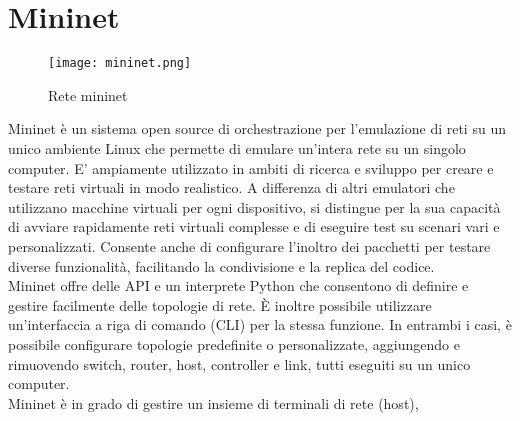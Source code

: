 \section{Mininet}
\label{ch:Mininet}
\begin{figure}[h]
    \centering
   \texttt{[image: mininet.png]}
    \caption{Rete mininet}
    \label{fig:mininet}
\end{figure}
Mininet \cite{mininet} è un sistema open source di orchestrazione per l'emulazione di reti su un unico ambiente Linux che permette di emulare un'intera rete su un singolo computer.
E' ampiamente utilizzato in ambiti di ricerca e sviluppo per creare e testare reti virtuali in modo realistico.
A differenza di altri emulatori che utilizzano macchine virtuali per ogni dispositivo, si distingue per la sua capacità di avviare rapidamente reti virtuali complesse e di eseguire test su scenari vari e personalizzati.
Consente anche di configurare l'inoltro dei pacchetti per testare diverse funzionalità, facilitando la condivisione e la replica del codice.
\\Mininet offre delle API e un interprete Python che consentono di definire e gestire facilmente delle topologie di rete.
È inoltre possibile utilizzare un'interfaccia a riga di comando (CLI) per la stessa funzione.
In entrambi i casi, è possibile configurare topologie predefinite o personalizzate, aggiungendo e rimuovendo switch, router, host, controller e link, tutti eseguiti su un unico computer.
\\Mininet è in grado di gestire un insieme di terminali di rete (host), 
